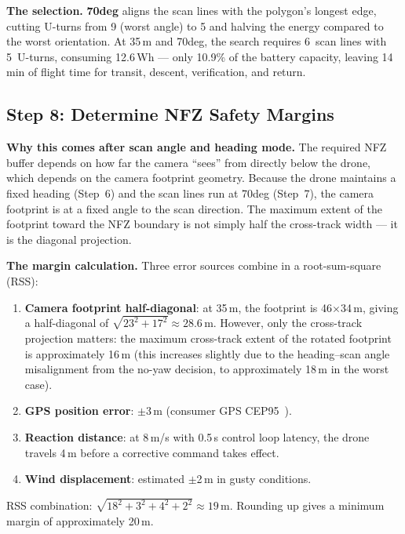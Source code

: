 \documentclass[10pt,a4paper]{article}
\def\textdegree{deg}%
\begin{document}
\textbf{The selection.} \textbf{70\textdegree} aligns the scan lines with the polygon's longest edge, cutting U-turns from 9 (worst angle) to 5 and halving the energy compared to the worst orientation. At 35\,m and 70\textdegree, the search requires 6~scan lines with 5~U-turns, consuming 12.6\,Wh --- only 10.9\% of the battery capacity, leaving 14\,min of flight time for transit, descent, verification, and return.


\subsection{Step 8: Determine NFZ Safety Margins}\label{sec:step8}

\textbf{Why this comes after scan angle and heading mode.} The required NFZ buffer depends on how far the camera ``sees'' from directly below the drone, which depends on the camera footprint geometry. Because the drone maintains a fixed heading (Step~6) and the scan lines run at 70\textdegree{} (Step~7), the camera footprint is at a fixed angle to the scan direction. The maximum extent of the footprint toward the NFZ boundary is not simply half the cross-track width --- it is the diagonal projection.

\textbf{The margin calculation.} Three error sources combine in a root-sum-square (RSS):

\begin{enumerate}[nosep]
  \item \textbf{Camera footprint half-diagonal}: at 35\,m, the footprint is 46$\times$34\,m, giving a half-diagonal of $\sqrt{23^2 + 17^2} \approx 28.6$\,m. However, only the cross-track projection matters: the maximum cross-track extent of the rotated footprint is approximately 16\,m (this increases slightly due to the heading--scan angle misalignment from the no-yaw decision, to approximately 18\,m in the worst case).
  \item \textbf{GPS position error}: $\pm$3\,m (consumer GPS CEP95~\citep{kaplan2017understanding}).
  \item \textbf{Reaction distance}: at 8\,m/s with 0.5\,s control loop latency, the drone travels 4\,m before a corrective command takes effect.
  \item \textbf{Wind displacement}: estimated $\pm$2\,m in gusty conditions.
\end{enumerate}

RSS combination: $\sqrt{18^2 + 3^2 + 4^2 + 2^2} \approx 19$\,m. Rounding up gives a minimum margin of approximately 20\,m.
\end{document}
